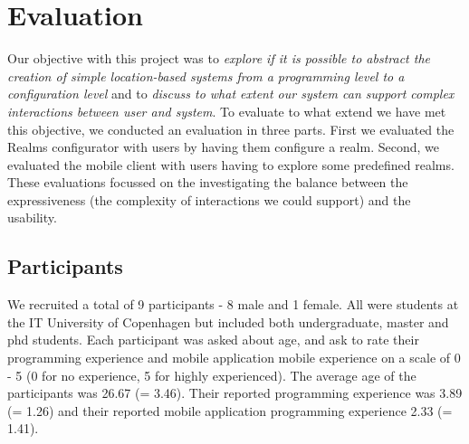 \section{Evaluation}
\label{sec.eval}
Our objective with this project was to \emph{explore if it is possible to abstract the creation of simple location-based systems from a programming level to a configuration level} and to \emph{discuss to what extent our system can support complex interactions between user and system}. To evaluate to what extend we have met this objective, we conducted an evaluation in three parts. First we evaluated the Realms configurator with users by having them configure a realm. Second, we evaluated the mobile client with users having to explore some predefined realms. These evaluations focussed on the investigating the balance between the expressiveness (the complexity of interactions we could support) and the usability.

\subsection{Participants} %
\label{sub:participants}
We recruited a total of 9 participants - 8 male and 1 female. All were students at the IT University of Copenhagen but included both undergraduate, master and phd students. Each participant was asked about age, and ask to rate their programming experience and mobile application mobile experience on a scale of 0 - 5 (0 for no experience, 5 for highly experienced). The average age of the participants was 26.67 (\sigma = 3.46). Their reported programming experience was 3.89 (\sigma = 1.26) and their reported mobile application programming experience 2.33 (\sigma =  1.41). 

